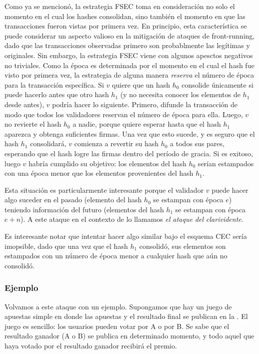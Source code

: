 Como ya se mencionó, 
la estrategia FSEC toma en consideración no solo el momento en el cual los hashes consolidan, sino
también el momento en que las transacciones fueron vistas por primera vez.
%
En principio, esta característica se puede considerar un aspecto valioso en la mitigación de ataques
de front-running, dado que las transacciones observadas primero son probablmente las legítimas y
originales.
Sin embargo, la estrategia FSEC viene con algunos apesctos negativos no triviales.
%
Como la época es determinada por el momento en el cual el hash fue visto por primera vez, 
la estrategia de alguna manera \textit{reserva} el número de época para la transacción específica.
Si $v$ quiere que un hash $h_0$ consolide únicamente si puede hacerlo antes que otro hash
$h_1$ (y no necesita conocer los elementos de $h_1$ desde antes), $v$ podría hacer lo siguiente.
%
Primero, difunde la transacción de modo que todos los validadores reservan el número de época para ella.
%
Luego, $v$ no revierte el hash $h_0$ a nadie, porque quiere esperar hasta que el hash $h_1$ aparezca
y obtenga suficientes firmas.
%
Una vez que esto sucede, y es seguro que el hash $h_1$ consolidará, $v$ comienza a revertir su hash
$h_0$ a todos sus pares, esperando que el hash logre las \SPH firmas
dentro del período de gracia.
Si es exitoso, luego $v$ habría cumplido su objetivo: los elementos del hash $h_0$ serían estampados
con una época menor que los elementos provenientes del hash $h_1$.
%

Esta situación es particularmente interesante porque el validador $v$ puede hacer algo
suceder en el pasado (elemento del hash $h_0$ se estampan con época $e$) teniendo información
del futuro (elementos del hash $h_1$ se estampan con época $e+n$). A este ataque en el contexto
de \hashchain lo llamamos \textit{el ataque del clarividente}.
%

Es interesante notar que intentar hacer algo similar bajo el esquema CEC sería imopsible, dado
que una vez que el hash $h_1$ consolidó, sus elementos son estampados con un número de época menor
a cualquier hash que aún no consolidó.
%

\subsubsection{Ejemplo}

Volvamos a este ataque con un ejemplo. Supongamos que hay un juego de apuestas simple en donde
las apuestas y el resultado final se publican en la \hashchain. El juego es sencillo: los usuarios
pueden votar por A o por B. Se sabe que el resultado ganador (A o B) se publica en determinado momento,
y todo aquel que haya votado por el resultado ganador recibirá el premio.
%

